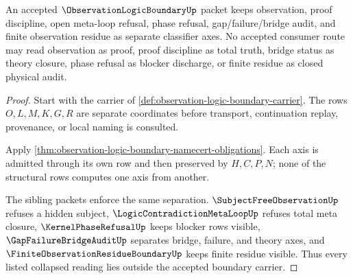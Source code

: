 \begin{theorem}
\label{thm:observation-logic-boundary-axis-separation}
An accepted $\ObservationLogicBoundaryUp$ packet keeps observation, proof discipline, open meta-loop refusal, phase refusal, gap/failure/bridge audit, and finite observation residue as separate classifier axes. No accepted consumer route may read observation as proof, proof discipline as total truth, bridge status as theory closure, phase refusal as blocker discharge, or finite residue as closed physical audit.
\end{theorem}
\begin{proof}
Start with the carrier of \autoref{def:observation-logic-boundary-carrier}. The rows $O,L,M,K,G,R$ are separate coordinates before transport, continuation replay, provenance, or local naming is consulted.

Apply \autoref{thm:observation-logic-boundary-namecert-obligations}. Each axis is admitted through its own row and then preserved by $H,C,P,N$; none of the structural rows computes one axis from another.

The sibling packets enforce the same separation. $\SubjectFreeObservationUp$ refuses a hidden subject, $\LogicContradictionMetaLoopUp$ refuses total meta closure, $\KernelPhaseRefusalUp$ keeps blocker rows visible, $\GapFailureBridgeAuditUp$ separates bridge, failure, and theory axes, and $\FiniteObservationResidueBoundaryUp$ keeps finite residue visible. Thus every listed collapsed reading lies outside the accepted boundary carrier.
\end{proof}

